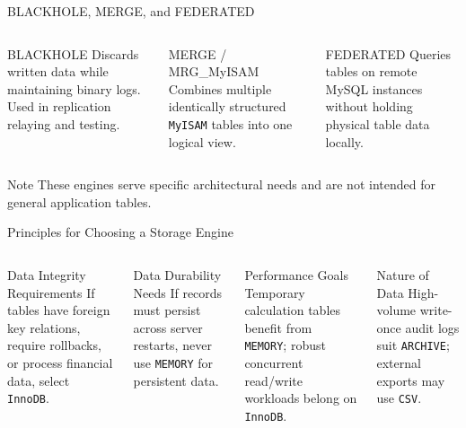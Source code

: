 \documentclass[aspectratio=169,11pt]{beamer}
\newcommand{\code}[1]{\texttt{#1}}
\begin{document}
\begin{frame}{BLACKHOLE, MERGE, and FEDERATED}
\begin{columns}[T,onlytextwidth]
\begin{block}{BLACKHOLE}
\small Discards written data while maintaining binary logs. Used in replication relaying and testing.
\end{block}
\begin{block}{MERGE / MRG\_MyISAM}
\small Combines multiple identically structured \code{MyISAM} tables into one logical view.
\end{block}
\begin{block}{FEDERATED}
\small Queries tables on remote MySQL instances without holding physical table data locally.
\end{block}
\end{columns}
\vspace{0.25cm}
\begin{alertblock}{Note}
These engines serve specific architectural needs and are not intended for general application tables.
\end{alertblock}
\end{frame}

\begin{frame}{Principles for Choosing a Storage Engine}
\begin{columns}[T,onlytextwidth]
\begin{block}{Data Integrity Requirements}
If tables have foreign key relations, require rollbacks, or process financial data, select \code{InnoDB}.
\end{block}
\begin{block}{Data Durability Needs}
If records must persist across server restarts, never use \code{MEMORY} for persistent data.
\end{block}
\begin{block}{Performance Goals}
Temporary calculation tables benefit from \code{MEMORY}; robust concurrent read/write workloads belong on \code{InnoDB}.
\end{block}
\begin{block}{Nature of Data}
High-volume write-once audit logs suit \code{ARCHIVE}; external exports may use \code{CSV}.
\end{block}
\end{columns}
\end{frame}
\end{document}
